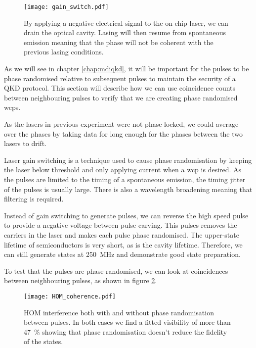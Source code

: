 {\begin{figure}[tbp]
	\centering
	\texttt{[image: gain\_switch.pdf]}
	\caption[Gain switching of the on-chip lasers at \SI{250}{MHz}]{By applying a negative electrical signal to the on-chip laser, we can drain the optical cavity. Lasing will then resume from spontaneous emission meaning that the phase will not be coherent with the previous lasing conditions.}
	\label{fig:gain_switch}
\end{figure}

As we will see in chapter \ref{chap:mdiqkd}, it will be important for the pulses to be phase randomised relative to subsequent pulses to maintain the security of a \ac{QKD} protocol. This section will describe how we can use coincidence counts between neighbouring pulses to verify that we are creating phase randomised \acp{wcp}.

As the lasers in previous experiment were not phase locked, we could average over the phases by taking data for long enough for the phases between the two lasers to drift.

Laser gain switching is a technique used to cause phase randomisation by keeping the laser below threshold and only applying current when a \ac{wcp} is desired. As the pulses are limited to the timing of a spontaneous emission, the timing jitter of the pulses is usually large. There is also a wavelength broadening meaning that filtering is required. 

Instead of gain switching to generate pulses, we can reverse the high speed pulse to provide a negative voltage between pulse carving. This pulses removes the carriers in the laser and makes each pulse phase randomised. The upper-state lifetime of semiconductors is very short, as is the cavity lifetime. Therefore, we can still generate states at \SI{250}{MHz} and demonstrate good state preparation.

To test that the pulses are phase randomised, we can look at coincidences between neighbouring pulses, as shown in figure \ref{fig:HOM_coherence}.  

\begin{figure}[tbp]
	\centering
	\texttt{[image: HOM\_coherence.pdf]}
	\caption[HOM interference with and without phase randomisation]{\ac{HOM} interference both with and without phase randomisation between pulses. In both cases we find a fitted visibility of more than \SI{47}{\%} showing that phase randomisation doesn't reduce the fidelity of the states.}
	\label{fig:HOM_coherence}
\end{figure}

}
